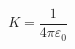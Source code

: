 \documentclass[preview]{standalone}
\begin{document}
\begin{align*}
K = \dfrac{1}{4 \pi \varepsilon_0}
\end{align*}
\end{document}
